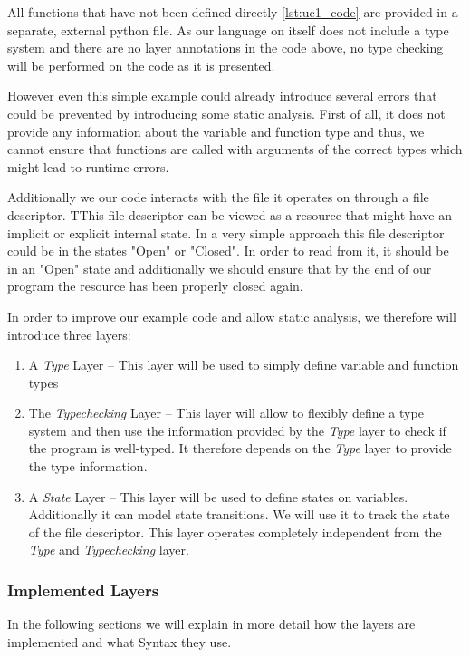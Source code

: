 All functions that have not been defined directly \ref{lst:uc1_code} are provided in a separate, external python file. As our language on itself does not include a type system and there are no layer annotations in the code above, no type checking will be performed on the code as it is presented.

However even this simple example could already introduce several errors that could be prevented by introducing some static analysis. First of all, it does not provide any information about the variable and function type and thus, we cannot ensure that functions are called with arguments of the correct types which might lead to runtime errors.

Additionally we our code interacts with the file it operates on through a file descriptor. TThis file descriptor can be viewed as a resource that might have an implicit or explicit internal state. In a very simple approach this file descriptor could be in the states "Open" or "Closed". In order to read from it, it should be in an "Open" state and additionally we should ensure that by the end of our program the resource has been properly closed again.

In order to improve our example code and allow static analysis, we therefore will introduce three layers:
\begin{enumerate}
	\item A \textit{Type} Layer -- This layer will be used to simply define variable and function types
	\item The \textit{Typechecking} Layer -- This layer will allow to flexibly define a type system and then use the information provided by the \textit{Type} layer to check if the program is well-typed. It therefore depends on the \textit{Type} layer to provide the type information.
	\item A \textit{State} Layer -- This layer will be used to define states on variables. Additionally it can model state transitions. We will use it to track the state of the file descriptor. This layer operates completely independent from the \textit{Type} and \textit{Typechecking} layer.
\end{enumerate}

\subsubsection{Implemented Layers}
In the following sections we will explain in more detail how the layers are implemented and what Syntax they use.

